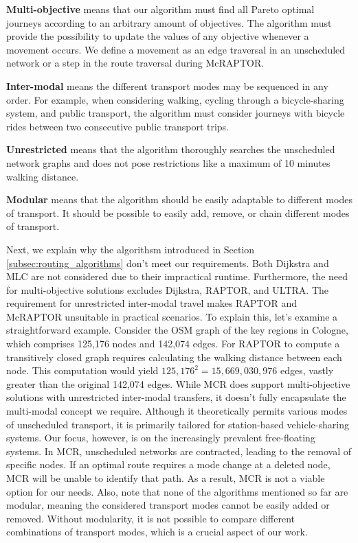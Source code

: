 \textbf{Multi-objective} means that our algorithm must find all Pareto optimal journeys according to an arbitrary amount of objectives.
The algorithm must provide the possibility to update the values of any objective whenever a movement occurs.
We define a movement as an edge traversal in an unscheduled network or a step in the route traversal during McRAPTOR.

\textbf{Inter-modal} means the different transport modes may be sequenced in any order.
For example, when considering walking, cycling through a bicycle-sharing system, and public transport, the algorithm must consider journeys with bicycle rides between two consecutive public transport trips.

\textbf{Unrestricted} means that the algorithm thoroughly searches the unscheduled network graphs and does not pose restrictions like a maximum of 10 minutes walking distance.

\textbf{Modular} means that the algorithm should be easily adaptable to different modes of transport.
It should be possible to easily add, remove, or chain different modes of transport.


Next, we explain why the algorithsm introduced in Section \ref{subsec:routing_algorithms} don't meet our requirements.
Both Dijkstra and MLC are not considered due to their impractical runtime.
Furthermore, the need for multi-objective solutions excludes Dijkstra, RAPTOR, and ULTRA.
The requirement for unrestricted inter-modal travel makes RAPTOR and McRAPTOR unsuitable in practical scenarios.
To explain this, let's examine a straightforward example.
Consider the OSM graph of the key regions in Cologne, which comprises 125,176 nodes and 142,074 edges.
For RAPTOR to compute a transitively closed graph requires calculating the walking distance between each node.
This computation would yield \(125,176^2 = 15,669,030,976\) edges, vastly greater than the original 142,074 edges.
While MCR does support multi-objective solutions with unrestricted inter-modal transfers, it doesn't fully encapsulate the multi-modal concept we require.
Although it theoretically permits various modes of unscheduled transport, it is primarily tailored for station-based vehicle-sharing systems.
Our focus, however, is on the increasingly prevalent free-floating systems.
In MCR, unscheduled networks are contracted, leading to the removal of specific nodes.
If an optimal route requires a mode change at a deleted node, MCR will be unable to identify that path.
As a result, MCR is not a viable option for our needs.
Also, note that none of the algorithms mentioned so far are modular, meaning the considered transport modes cannot be easily added or removed.
Without modularity, it is not possible to compare different combinations of transport modes, which is a crucial aspect of our work.

